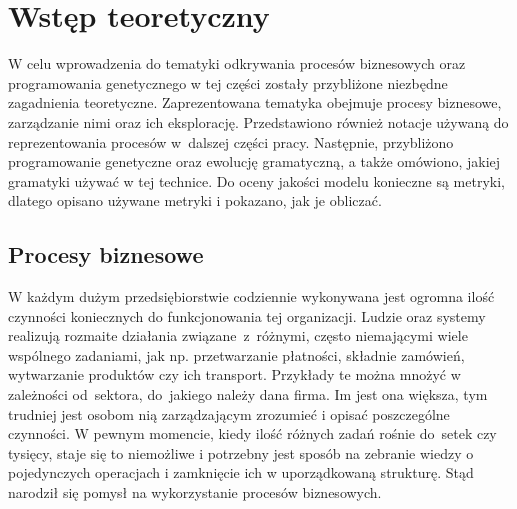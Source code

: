 \chapter{Wstęp teoretyczny}
\label{cha:wstepTeoretyczny}

W celu wprowadzenia do tematyki odkrywania procesów biznesowych oraz programowania genetycznego w tej części zostały przybliżone niezbędne zagadnienia teoretyczne. Zaprezentowana tematyka obejmuje procesy biznesowe, zarządzanie nimi oraz ich eksplorację. Przedstawiono również notacje używaną  do reprezentowania procesów w~dalszej części pracy. Następnie, przybliżono programowanie genetyczne oraz ewolucję gramatyczną, a także omówiono, jakiej gramatyki używać w tej technice. Do oceny jakości modelu konieczne są metryki, dlatego opisano używane metryki i pokazano, jak je obliczać.



\section{Procesy biznesowe}
\label{sec:procesyBiznesowe}

W każdym dużym przedsiębiorstwie codziennie wykonywana jest ogromna ilość czynności koniecznych do funkcjonowania tej organizacji. Ludzie oraz systemy realizują rozmaite działania związane~z~różnymi, często niemającymi wiele wspólnego zadaniami, jak np. przetwarzanie płatności, składnie zamówień, wytwarzanie produktów czy ich transport. Przykłady te można mnożyć w zależności od~sektora, do~jakiego należy dana firma. Im jest ona większa, tym trudniej jest osobom nią zarządzającym zrozumieć i opisać poszczególne czynności. W pewnym momencie, kiedy ilość różnych zadań rośnie do~setek czy tysięcy, staje się to niemożliwe i potrzebny jest sposób na zebranie wiedzy o pojedynczych operacjach i zamknięcie ich w uporządkowaną strukturę. Stąd narodził się pomysł na wykorzystanie procesów biznesowych.

